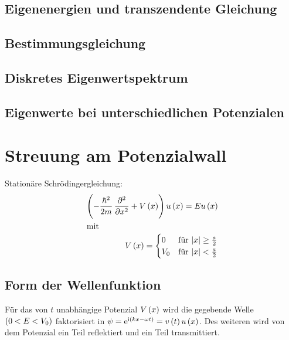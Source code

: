 \subsection{Eigenenergien und transzendente Gleichung}

\subsection{Bestimmungsgleichung}

\subsection{Diskretes Eigenwertspektrum}

\subsection{Eigenwerte bei unterschiedlichen Potenzialen}

\section{Streuung am Potenzialwall}

Stationäre Schrödingergleichung:
\begin{align*}
 \del{-\frac{\hbar^2}{2m} \dpd[2]{}{x} + V\del{x}} u\del{x} = E u\del{x}\\
 \intertext{mit}
 V\del{x} =
 \begin{cases}
  0 & \text{für } \abs{x} \geq \frac{a}{2}\\
  V_0 & \text{für } \abs{x} < \frac{a}{2}
 \end{cases}
\end{align*}


\subsection{Form der Wellenfunktion}
Für das von $t$ unabhängige Potenzial $V\del{x}$ wird die gegebende Welle $\del{0 < E < V_0}$ faktorisiert in $\psi = \ee^{\ii\del{kx-\omega t}} = v\del{t}u\del{x}$.
Des weiteren wird von dem Potenzial ein Teil reflektiert und ein Teil transmittiert.

